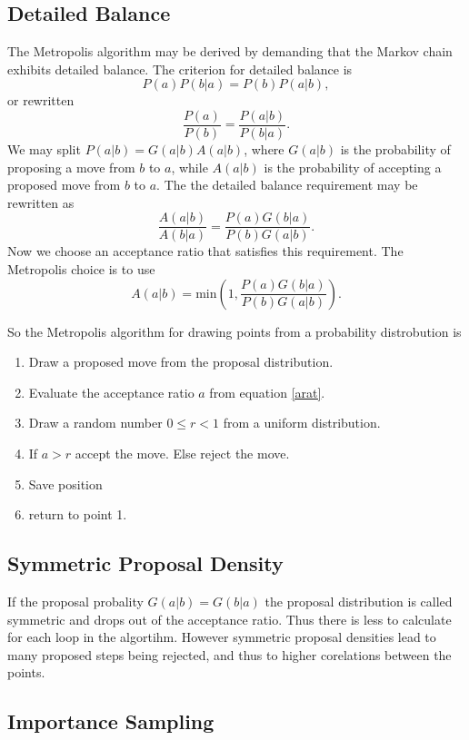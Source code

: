 \documentclass[a4paper,norsk,10pt]{article}
\newcommand{\be}{\begin{equation}}
\newcommand{\ee}{\end{equation}}
\newcommand{\f}{\frac}
\begin{document}
\subsection{Detailed Balance}
The Metropolis algorithm may be derived by demanding that the Markov chain exhibits detailed balance.
The criterion for detailed balance is
\be
P(a)P(b|a) = P(b)P(a|b),
\ee
or rewritten
\be
\f{P(a)}{P(b)} = \f{P(a|b)}{P(b|a)}.
\ee
We may split \(P(a|b) = G(a|b)A(a|b)\), where \(G(a|b)\) is the probability of proposing a move from $b$ to $a$, while
$A(a|b)$ is the probability of accepting a proposed move from $b$ to $a$. The the detailed balance requirement may be rewritten as
\be
\f{A(a|b)}{A(b|a)} = \f{P(a)G(b|a)}{P(b)G(a|b)}.
\ee
Now we choose an acceptance ratio that satisfies this requirement. The Metropolis choice is to use
\be
A(a|b) = \mathrm{min}\left(1,\f{P(a)G(b|a)}{P(b)G(a|b)}\right).\label{arat}
\ee

So the Metropolis algorithm for drawing points from a probability distrobution is
\begin{enumerate}
\item
  Draw a proposed move from the proposal distribution.
\item
  Evaluate the acceptance ratio $a$ from equation \ref{arat}.
\item
  Draw a random number $0 \leq r < 1$ from a uniform distribution.
\item
  If $a>r$ accept the move. Else reject the move.
\item
  Save position
\item
  return to point 1.
\end{enumerate}
  
  

\subsection{Symmetric Proposal Density}

If the proposal probality $G(a|b) = G(b|a)$ the proposal distribution is called symmetric and drops out of the acceptance ratio.
Thus there is less to calculate for each loop in the algortihm. However symmetric proposal densities lead to many proposed steps being rejected,
and thus to higher corelations between the points.


\subsection{Importance Sampling}
\end{document}
